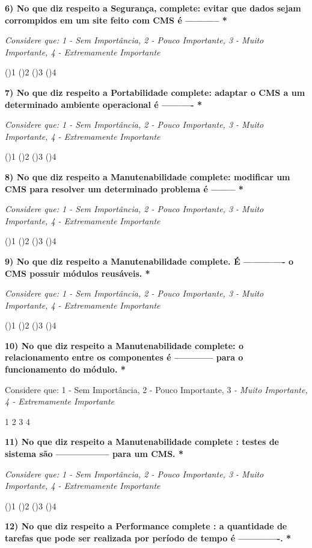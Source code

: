 \begin{apendicesenv}
\textbf{6) No que diz respeito a Segurança, complete: evitar que dados sejam corrompidos em um site feito com CMS é ----------- *}

\textit{Considere que: 1 - Sem Importância, 2 - Pouco Importante, 3 - Muito Importante, 4 - Extremamente Importante}

()1
()2
()3
()4




\textbf{7) No que diz respeito a Portabilidade complete: adaptar o CMS a um determinado ambiente operacional é ---------- *}

\textit{Considere que: 1 - Sem Importância, 2 - Pouco Importante, 3 - Muito Importante, 4 - Extremamente Importante}

()1
()2
()3
()4




\textbf{8) No que diz respeito a Manutenabilidade complete: modificar um CMS para resolver um determinado problema é -------- *}

\textit{Considere que: 1 - Sem Importância, 2 - Pouco Importante, 3 - Muito Importante, 4 - Extremamente Importante}

()1
()2
()3
()4




\textbf{9) No que diz respeito a Manutenabilidade complete. É ------------- o CMS possuir módulos reusáveis. *}

\textit{Considere que: 1 - Sem Importância, 2 - Pouco Importante, 3 - Muito Importante, 4 - Extremamente Importante}

()1
()2
()3
()4




\textbf{10) No que diz respeito a Manutenabilidade complete: o relacionamento entre os componentes é ------------ para o funcionamento do módulo. *}

Considere que: 1 - Sem Importância, 2 - Pouco Importante, 3 \textit{- Muito Importante, 4 - Extremamente Importante}

1
2
3
4




\textbf{11) No que diz respeito a Manutenabilidade complete : testes de sistema são ----------------- para um CMS. *}

\textit{Considere que: 1 - Sem Importância, 2 - Pouco Importante, 3 - Muito Importante, 4 - Extremamente Importante}

()1
()2
()3
()4




\textbf{12) No que diz respeito a Performance complete : a quantidade de tarefas que pode ser realizada por período de tempo é -------------. *}


\end{apendicesenv}
